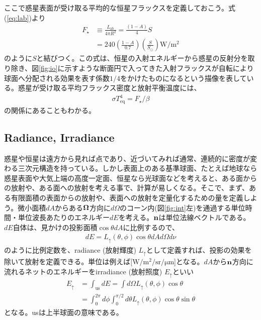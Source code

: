 ここで惑星表面が受け取る平均的な恒星フラックスを定義しておこう。式(\ref{eq:lab})より
\begin{align}
\label{eq:aveinpuF}
  F_\star &\equiv \frac{L_{\mathrm{ab}}}{4 \pi R^2}= \frac{(1 - A)}{4} S \\
  &= 240 \left(\frac{1-A}{0.7}\right) \left(\frac{S}{S_\odot}\right) \mathrm{W/m^2} 
\end{align}
のように$S$と結びつく。この式は、恒星の入射エネルギーから惑星の反射分を取り除き、図\ref{fig:io}に示すような断面円で入ってきた入射フラックスが自転により球面へ分配される効果を表す係数$1/4$をかけたものになるという描像を表している。惑星が受け取る平均フラックス密度と放射平衡温度には、
\begin{align}
  \label{eq:teq}
\sigma T^4_{\mathrm{eq}} = F_\star/\beta 
\end{align}
の関係にあることもわかる。

\subsection*{Radiance, Irradiance}

惑星や恒星は遠方から見れば点であり、近づいてみれば通常、連続的に密度が変わる三次元構造を持っている。しかし表面上のある基準球面、たとえば地球なら惑星表面や大気上端の高度一定面、恒星なら光球面などを考えると、ある面からの放射や、ある面への放射を考える事で、計算が易しくなる。そこで、まず、ある有限面積の表面からの放射や、表面への放射を定量化するための量を定義しよう。微小面積$d A$からある${\bf \Omega}$方向に$d \Omega$のコーン内(図\ref{fig:int}左)を通過する単位時間・単位波長あたりのエネルギー$d E$を考える。${\bf n}$は単位法線ベクトルである。$d E$自体は、見かけの投影面積$\cos{\theta} d A$に比例するので、
\begin{align}
d E = L_{\uparrow}(\theta,\phi) \cos{\theta} d A d \Omega d \nu
\end{align}
のように比例定数を、radiance (放射輝度)  $L_{\uparrow}$として定義すれば、投影の効果を除いて放射を定義できる。単位は例えば[$\mathrm{W/m^2/sr/\mu m}$]となる。$dA$から${\bf n}$方向に流れるネットのエネルギーをirradiance (放射照度)  $E_{\uparrow}$といい
\begin{align}
E_{\uparrow} &= \int_{\mathrm{us}} d E = \int  d \Omega L_{\uparrow} (\theta,\phi) \cos{\theta} \\
\label{eq:rad}
&= \int_{0}^{2 \pi} d \phi  \int_{0}^{\pi/2} d \theta L_{\uparrow} (\theta,\phi) \cos{\theta} \sin{\theta}
\end{align}
となる。usは上半球面の意味である。

